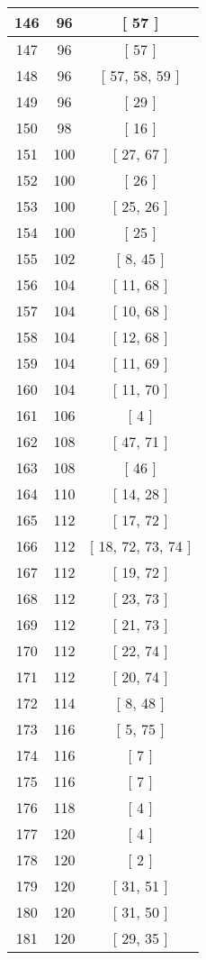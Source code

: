 \begin{center}
\begin{longtable}[H]{|| c c c ||}
\hline
146 & 96 & [ 57 ] \\ 
\hline
147 & 96 & [ 57 ] \\ 
\hline
148 & 96 & [ 57, 58, 59 ] \\ 
\hline
149 & 96 & [ 29 ] \\ 
\hline
150 & 98 & [ 16 ] \\ 
\hline
151 & 100 & [ 27, 67 ] \\ 
\hline
152 & 100 & [ 26 ] \\ 
\hline
153 & 100 & [ 25, 26 ] \\ 
\hline
154 & 100 & [ 25 ] \\ 
\hline
155 & 102 & [ 8, 45 ] \\ 
\hline
156 & 104 & [ 11, 68 ] \\ 
\hline
157 & 104 & [ 10, 68 ] \\ 
\hline
158 & 104 & [ 12, 68 ] \\ 
\hline
159 & 104 & [ 11, 69 ] \\ 
\hline
160 & 104 & [ 11, 70 ] \\ 
\hline
161 & 106 & [ 4 ] \\ 
\hline
162 & 108 & [ 47, 71 ] \\ 
\hline
163 & 108 & [ 46 ] \\ 
\hline
164 & 110 & [ 14, 28 ] \\ 
\hline
165 & 112 & [ 17, 72 ] \\ 
\hline
166 & 112 & [ 18, 72, 73, 74 ] \\ 
\hline
167 & 112 & [ 19, 72 ] \\ 
\hline
168 & 112 & [ 23, 73 ] \\ 
\hline
169 & 112 & [ 21, 73 ] \\ 
\hline
170 & 112 & [ 22, 74 ] \\ 
\hline
171 & 112 & [ 20, 74 ] \\ 
\hline
172 & 114 & [ 8, 48 ] \\ 
\hline
173 & 116 & [ 5, 75 ] \\ 
\hline
174 & 116 & [ 7 ] \\ 
\hline
175 & 116 & [ 7 ] \\ 
\hline
176 & 118 & [ 4 ] \\ 
\hline
177 & 120 & [ 4 ] \\ 
\hline
178 & 120 & [ 2 ] \\ 
\hline
179 & 120 & [ 31, 51 ] \\ 
\hline
180 & 120 & [ 31, 50 ] \\ 
\hline
181 & 120 & [ 29, 35 ] \\ 

\end{longtable}
\end{center}
